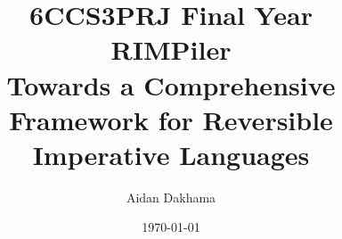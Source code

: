 \documentclass[11pt]{informatics-report}
\title{6CCS3PRJ Final Year\\\vspace{0.2cm}RIMPiler\\\large Towards a Comprehensive Framework for Reversible \\Imperative Languages}
\author{Aidan Dakhama}
\date{\today}
\begin{document}
\createFrontMatter
\onehalfspacing
\tableofcontents
\doublespacing

\renewcommand{\bibsection}{\chapter{Bibliography}}















\appendix
%
%
%
\end{document}
